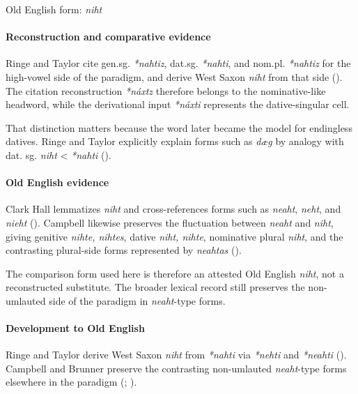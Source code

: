 \documentclass[
  british,
  a4paper,
]{article}
\begin{document}
Old English form: \emph{niht}

\paragraph{Reconstruction and comparative
evidence}\label{reconstruction-and-comparative-evidence-51}

Ringe and Taylor cite gen.sg. \emph{*nahtiz}, dat.sg. \emph{*nahti}, and
nom.pl. \emph{*nahtiz} for the high-vowel side of the paradigm, and
derive West Saxon \emph{niht} from that side
(). The
citation reconstruction \emph{*náxtz} therefore belongs to the
nominative-like headword, while the derivational input \emph{*náxti}
represents the dative-singular cell.

That distinction matters because the word later became the model for
endingless datives. Ringe and Taylor explicitly explain forms such as
\emph{dæg} by analogy with dat. sg. \emph{niht} \textless{}
\emph{*nahti} ().

\paragraph{Old English evidence}\label{old-english-evidence-51}

Clark Hall lemmatizes \emph{niht} and cross-references forms such as
\emph{neaht}, \emph{neht}, and \emph{nieht}
(). Campbell likewise
preserves the fluctuation between \emph{neaht} and \emph{niht}, giving
genitive \emph{nihte, nihtes}, dative \emph{niht, nihte}, nominative
plural \emph{niht}, and the contrasting plural-side forms represented by
\emph{neahtas} ().

The comparison form used here is therefore an attested Old English
\emph{niht}, not a reconstructed substitute. The broader lexical record
still preserves the non-umlauted side of the paradigm in
\emph{neaht}-type forms.

\paragraph{Development to Old
English}\label{development-to-old-english-51}

Ringe and Taylor derive West Saxon \emph{niht} from \emph{*nahti} via
\emph{*nehti} and \emph{*neahti} (). Campbell and Brunner preserve the contrasting
non-umlauted \emph{neaht}-type forms elsewhere in the paradigm
(;
).
\end{document}
